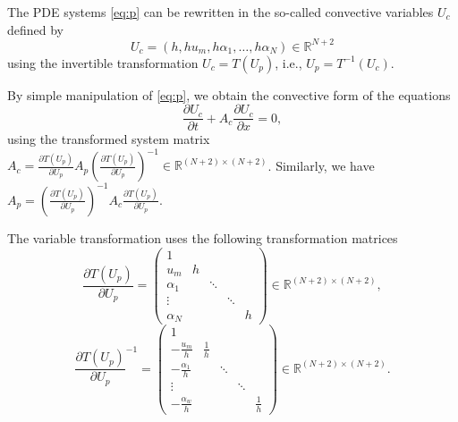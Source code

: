 \documentclass[a4paper, 11pt]{article}
\begin{document}
The PDE systems \eqref{eq:p} can be rewritten in the so-called convective variables $U_{c}$ defined by
\begin{equation}\label{eq:c_vars}
    U_{c} =(h, h u_m, h\alpha_1, \ldots, h\alpha_N) \in \mathbb{R}^{N+2}
\end{equation}
using the invertible transformation $U_{c} = T\left(U_{p}\right)$, i.e., $U_{p} = T^{-1}\left(U_{c}\right)$.

By simple manipulation of \eqref{eq:p}, we obtain the convective form of the equations
\begin{equation}\label{eq:c}
    \frac{\partial U_{c}}{\partial t} + A_{c} \frac{\partial U_{c}}{\partial x} = 0,
\end{equation}
using the transformed system matrix $A_{c} = \frac{\partial T\left(U_{p}\right)}{\partial U_{p}} A_{p} \left(\frac{\partial  T\left(U_{p}\right)}{\partial U_{p}}\right)^{-1}\in \mathbb{R}^{(N+2)\times(N+2)}$. Similarly, we have $A_{p} = \left(\frac{\partial T\left(U_{p}\right)}{\partial U_{p}}\right)^{-1} A_{c} \frac{\partial  T\left(U_{p}\right)}{\partial U_{p}}$.

The variable transformation uses the following transformation matrices
\begin{equation}\label{eq:dervars}
    \frac{\partial T\left(U_{p}\right)}{\partial U_{p}} =
    \left(\begin{array}{ccccc}
    1 & & & &\\
    u_m & h & & &\\
    \alpha_1 & & \ddots & &\\
    \vdots & & & \ddots &\\
    \alpha_N & & & & h
    \end{array}\right) \in \mathbb{R}^{(N+2)\times(N+2)},
\end{equation}
\begin{equation}\label{eq:inv_dervars}
    \frac{\partial T\left(U_{p}\right)}{\partial U_{p}}^{-1} =
    \left(\begin{array}{ccccc}
        1 & & & &\\
        -\frac{u_m}{h} & \frac{1}{h} & & &\\
        -\frac{\alpha_1}{h} & & \ddots & &\\
        \vdots & & & \ddots &\\
        -\frac{\alpha_w}{h} & & & & \frac{1}{h}
    \end{array}\right) \in \mathbb{R}^{(N+2)\times(N+2)}.
\end{equation}
\end{document}
